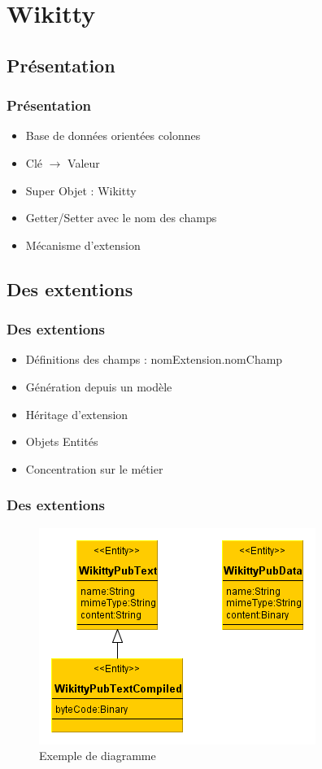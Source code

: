 \documentclass[12pt,a4paper,utf8x]{beamer}
\begin{document}
\section{Wikitty} 
\subsection*{Présentation} 
\begin{frame}\frametitle{Présentation} 
\begin{itemize}
\item Base de données orientées colonnes
\item Clé $\to$ Valeur 
\item Super Objet : Wikitty
\item Getter/Setter avec le nom des champs
\item Mécanisme d'extension
\end{itemize}
\end{frame}


\subsection*{Des extentions} 
\begin{frame}\frametitle{Des extentions} 
\begin{itemize}
\item Définitions des champs : nomExtension.nomChamp
\item Génération depuis un modèle
\item Héritage d'extension
\item Objets Entités
\item Concentration sur le métier
\end{itemize}
\end{frame}

\begin{frame}\frametitle{Des extentions} 
\begin{figure}
\includegraphics[scale=0.6]{../image/wikittypub.png} 
\caption{Exemple de diagramme}
\end{figure}
\end{frame}
\end{document}
